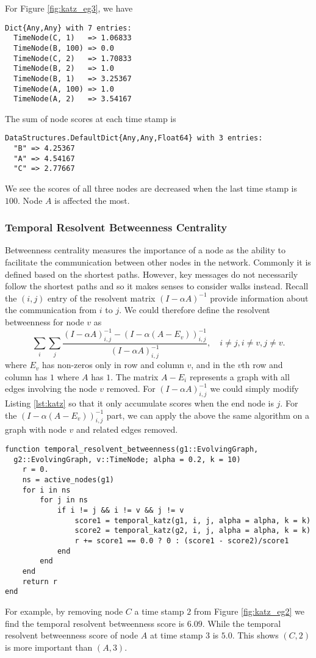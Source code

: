 \documentclass[12pt]{article}
\theoremstyle{definition}
\begin{document}
For Figure \ref{fig:katz_eg3}, we have
\begin{lstlisting}
Dict{Any,Any} with 7 entries:
  TimeNode(C, 1)   => 1.06833
  TimeNode(B, 100) => 0.0
  TimeNode(C, 2)   => 1.70833
  TimeNode(B, 2)   => 1.0
  TimeNode(B, 1)   => 3.25367
  TimeNode(A, 100) => 1.0
  TimeNode(A, 2)   => 3.54167
\end{lstlisting}
The sum of node scores at each time stamp is
\begin{lstlisting}
DataStructures.DefaultDict{Any,Any,Float64} with 3 entries:
  "B" => 4.25367
  "A" => 4.54167
  "C" => 2.77667
\end{lstlisting}
We see the scores of all three nodes are decreased when the last time stamp is $100$.
Node $A$ is affected the most.

\subsubsection{Temporal Resolvent Betweenness Centrality}

Betweenness centrality measures the importance of a node as the ability to facilitate the communication between other nodes in the network. Commonly it is defined based on the shortest paths. However, key messages do not necessarily follow the shortest paths and so it makes senses to consider walks instead.
Recall the $(i,j)$ entry of the resolvent matrix $(I - \alpha A)^{-1}$ provide information about the communication from $i$ to $j$. We could therefore define the resolvent betweenness for node $v$ as
\begin{equation}
  \sum_{i}\sum_j \frac{(I-\alpha A)^{-1}_{i,j} - (I - \alpha (A - E_v))^{-1}_{i,j}}{(I - \alpha A)^{-1}_{i,j}}, \quad i \ne j, i \ne v, j \ne v.
\end{equation}
where $E_v$ has non-zeros only in row and column $v$, and in the $v$th row and column has $1$ where $A$ has $1$.
The matrix $A - E_i$ represents a graph with all edges involving the node $v$ removed.
For $(I-\alpha A)^{-1}_{i,j}$ we could simply modify Listing \ref{lst:katz} so that it only accumulate scores when the end node is $j$. For the $(I - \alpha (A-E_v))^{-1}_{i,j}$ part, we can apply the above the same algorithm on a graph with node $v$ and related edges removed.
\begin{lstlisting}
function temporal_resolvent_betweenness(g1::EvolvingGraph,
  g2::EvolvingGraph, v::TimeNode; alpha = 0.2, k = 10)
    r = 0.
    ns = active_nodes(g1)
    for i in ns
        for j in ns
            if i != j && i != v && j != v
                score1 = temporal_katz(g1, i, j, alpha = alpha, k = k)
                score2 = temporal_katz(g2, i, j, alpha = alpha, k = k)
                r += score1 == 0.0 ? 0 : (score1 - score2)/score1
            end
        end
    end
    return r
end
\end{lstlisting}
For example, by removing node $C$ a time stamp $2$ from Figure \ref{fig:katz_eg2} we find
the temporal resolvent betweenness score is $6.09$. While the temporal resolvent betweenness score
of node $A$ at time stamp $3$ is $5.0$. This shows $(C,2)$ is more important than $(A,3)$.
\end{document}
